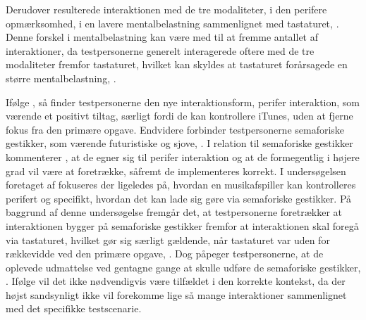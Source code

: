 Derudover resulterede interaktionen med de tre modaliteter, i den perifere opmærksomhed, i en lavere mentalbelastning sammenlignet med tastaturet, \parencite[s. 172]{PDF:ComparingInputModalities}. Denne forskel i mentalbelastning kan være med til at fremme antallet af interaktioner, da testpersonerne generelt interagerede oftere med de tre modaliteter fremfor tastaturet, hvilket kan skyldes at tastaturet forårsagede en større mentalbelastning, \parencite[ss. 174-175]{PDF:ComparingInputModalities}.    

Ifølge \textcite[ss. 173-174]{PDF:ComparingInputModalities}, så finder testpersonerne den nye interaktionsform, perifer interaktion, som værende et positivt tiltag, særligt fordi de kan kontrollere iTunes, uden at fjerne fokus fra den primære opgave. Endvidere forbinder testpersonerne semaforiske gestikker, som værende futuristiske og sjove, \parencite[s. 174]{PDF:ComparingInputModalities}. I relation til semaforiske gestikker kommenterer \textcite[s. 177]{PDF:ComparingInputModalities}, at de egner sig til perifer interaktion og at de formegentlig i højere grad vil være at foretrække, såfremt de implementeres korrekt.\blankline
%                    
I undersøgelsen foretaget af \textcite{PDF:AStudyOnTheUseOfSemaphoricGestures} fokuseres der ligeledes på, hvordan en musikafspiller kan kontrolleres perifert og specifikt, hvordan det kan lade sig gøre via semaforiske gestikker. På baggrund af denne undersøgelse fremgår det, at testpersonerne foretrækker at interaktionen bygger på semaforiske gestikker fremfor at interaktionen skal foregå via tastaturet, hvilket gør sig særligt gældende, når tastaturet var uden for rækkevidde ved den primære opgave, \parencite[s. 1963]{PDF:AStudyOnTheUseOfSemaphoricGestures}. Dog påpeger testpersonerne, at de oplevede udmattelse ved gentagne gange at skulle udføre de semaforiske gestikker, \parencite[s. 1963]{PDF:AStudyOnTheUseOfSemaphoricGestures}. Ifølge \textcite[s. 1963]{PDF:AStudyOnTheUseOfSemaphoricGestures} vil det ikke nødvendigvis være tilfældet i den korrekte kontekst, da der højst sandsynligt ikke vil forekomme lige så mange interaktioner sammenlignet med det specifikke testscenarie. 


